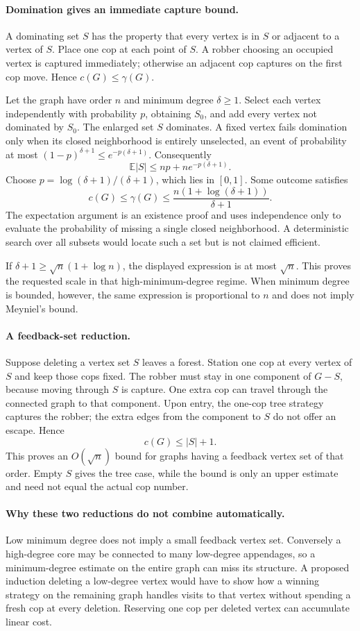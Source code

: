 \documentclass[11pt,a4paper]{article}
\begin{document}
\paragraph{Domination gives an immediate capture bound.}
A dominating set $S$ has the property that every vertex is in $S$ or adjacent to a vertex of $S$. Place one cop at each point of $S$. A robber choosing an occupied vertex is captured immediately; otherwise an adjacent cop captures on the first cop move. Hence $c(G)\le\gamma(G)$.

Let the graph have order $n$ and minimum degree $\delta\ge1$. Select each vertex independently with probability $p$, obtaining $S_0$, and add every vertex not dominated by $S_0$. The enlarged set $S$ dominates. A fixed vertex fails domination only when its closed neighborhood is entirely unselected, an event of probability at most $(1-p)^{\delta+1}\le e^{-p(\delta+1)}$. Consequently
\[
\mathbb E|S|\le np+ne^{-p(\delta+1)}.
\]
Choose $p=\log(\delta+1)/(\delta+1)$, which lies in $[0,1]$. Some outcome satisfies
\[
c(G)\le\gamma(G)\le
\frac{n(1+\log(\delta+1))}{\delta+1}.
\]
The expectation argument is an existence proof and uses independence only to evaluate the probability of missing a single closed neighborhood. A deterministic search over all subsets would locate such a set but is not claimed efficient.

If $\delta+1\ge\sqrt n(1+\log n)$, the displayed expression is at most $\sqrt n$. This proves the requested scale in that high-minimum-degree regime. When minimum degree is bounded, however, the same expression is proportional to $n$ and does not imply Meyniel's bound.

\paragraph{A feedback-set reduction.}
Suppose deleting a vertex set $S$ leaves a forest. Station one cop at every vertex of $S$ and keep those cops fixed. The robber must stay in one component of $G-S$, because moving through $S$ is capture. One extra cop can travel through the connected graph to that component. Upon entry, the one-cop tree strategy captures the robber; the extra edges from the component to $S$ do not offer an escape. Hence
\[
c(G)\le |S|+1.
\]
This proves an $O(\sqrt n)$ bound for graphs having a feedback vertex set of that order. Empty $S$ gives the tree case, while the bound is only an upper estimate and need not equal the actual cop number.

\paragraph{Why these two reductions do not combine automatically.}
Low minimum degree does not imply a small feedback vertex set. Conversely a high-degree core may be connected to many low-degree appendages, so a minimum-degree estimate on the entire graph can miss its structure. A proposed induction deleting a low-degree vertex would have to show how a winning strategy on the remaining graph handles visits to that vertex without spending a fresh cop at every deletion. Reserving one cop per deleted vertex can accumulate linear cost.
\end{document}
